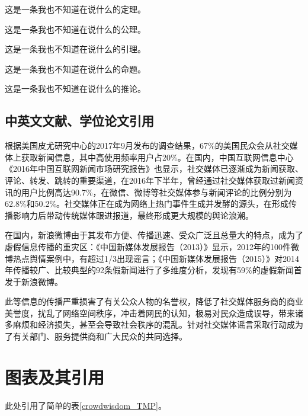 \documentclass[a4paper,AutoFakeBold,oneside,12pt]{book}
\begin{document}
\begin{theorem}
这是一条我也不知道在说什么的定理。
\end{theorem}

\begin{axiom}
这是一条我也不知道在说什么的公理。
\end{axiom}

\begin{lemma}
这是一条我也不知道在说什么的引理。
\end{lemma}

\begin{proposition}
这是一条我也不知道在说什么的命题。
\end{proposition}

\begin{corollary}
这是一条我也不知道在说什么的推论。
\end{corollary}

\subsection{中英文文献、学位论文引用}
根据美国皮尤研究中心的2017年9月发布的调查结果\cite{pew_news_use_2017}，67\%的美国民众会从社交媒体上获取新闻信息，其中高使用频率用户占20\%。在国内，中国互联网信息中心《2016年中国互联网新闻市场研究报告》\cite{internet_news_2016}也显示，社交媒体已逐渐成为新闻获取、评论、转发、跳转的重要渠道，在2016年下半年，曾经通过社交媒体获取过新闻资讯的用户比例高达90.7\%，在微信、微博等社交媒体参与新闻评论的比例分别为62.8\%和50.2\%。社交媒体正在成为网络上热门事件生成并发酵的源头，在形成传播影响力后带动传统媒体跟进报道，最终形成更大规模的舆论浪潮。\cite{Yang2012Automatic}

在国内，新浪微博由于其发布方便、传播迅速、受众广泛且总量大的特点，成为了虚假信息传播的重灾区：《中国新媒体发展报告（2013）》\cite{唐绪军2013中国新媒体发展报告}显示，2012年的100件微博热点舆情案例中，有超过1/3出现谣言；《中国新媒体发展报告（2015）》\cite{唐绪军2015中国新媒体发展报告}对2014年传播较广、比较典型的92条假新闻进行了多维度分析，发现有59\%的虚假新闻首发于新浪微博。

此等信息的传播严重损害了有关公众人物的名誉权，降低了社交媒体服务商的商业美誉度，扰乱了网络空间秩序，冲击着网民的认知，极易对民众造成误导，带来诸多麻烦和经济损失，甚至会导致社会秩序的混乱。针对社交媒体谣言采取行动成为了有关部门、服务提供商和广大民众的共同选择。\cite{周兴2017基于深度学习的谣言检测及模式挖掘}

\section{图表及其引用}
此处引用了简单的表\ref{crowdwisdom_TMP}。
\end{document}
